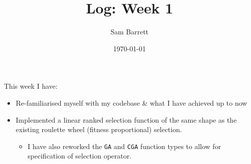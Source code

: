\documentclass[11pt]{article}
\author{Sam Barrett}
\date{\today}
\title{Log: Week 1}
\begin{document}
\maketitle
This week I have:

\begin{itemize}
\item Re-familiarised myself with my codebase \& what I have achieved up to now
\item Implemented a linear ranked selection function of the same shape as the existing roulette wheel (fitness proportional) selection.
\begin{itemize}
\item I have also reworked the \texttt{GA} and \texttt{CGA} function types to allow for specification of selection operator.
\end{itemize}
\end{itemize}
\end{document}

